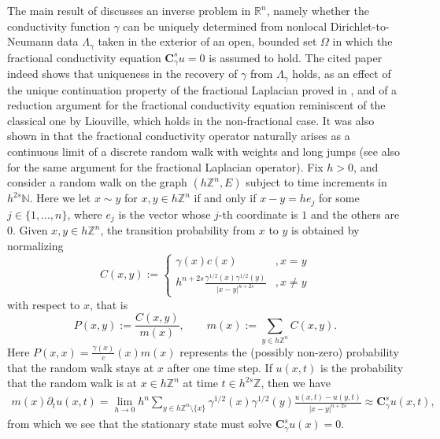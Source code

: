 \documentclass[a4paper,11pt,oneside]{amsart}
\newcommand{\Z}{{\mathbb Z}}
\newcommand{\N}{{\mathbb N}}
\begin{document}
The main result of \cite{C20} discusses an inverse problem in $\mathbb R^n$, namely whether the conductivity function $\gamma$ can be uniquely determined from nonlocal Dirichlet-to-Neumann data $\Lambda_\gamma$ taken in the exterior of an open, bounded set $\Omega$ in which the fractional conductivity equation $\mathbf C^s_\gamma u=0$ is assumed to hold. The cited paper indeed shows that uniqueness in the recovery of $\gamma$ from $\Lambda_\gamma$ holds, as an effect of the unique continuation property of the fractional Laplacian proved in \cite{GSU20}, and of a reduction argument for the fractional conductivity equation reminiscent of the classical one by Liouville, which holds in the non-fractional case. It was also shown in \cite[Section 5]{C20} that the fractional conductivity operator naturally arises as a continuous limit of a discrete random walk with weights and long jumps (see also \cite{Val09} for the same argument for the fractional Laplacian operator). Fix $h>0$, and consider a random walk on the graph $(h\Z^n,E)$ subject to time increments in $h^{2s}\N$. Here we let $x\sim y$ for $x,y\in h\Z^n$ if and only if $x-y=he_j$ for some $j\in\{1,...,n\}$, where $e_j$ is the vector whose $j$-th coordinate is $1$ and the others are $0$. Given $x,y\in h\Z^n$, the transition probability from $x$ to $y$ is obtained by normalizing
$$C(x,y):=\begin{cases}
    \gamma(x)c(x)  &, x=y \\
    h^{n+2s}\frac{\gamma^{1/2}(x)\gamma^{1/2}(y)}{|x-y|^{n+2s}}  &, x\neq y
\end{cases}$$
with respect to $x$, that is
$$ P(x,y):= \frac{C(x,y)}{m(x)}, \qquad m(x):= \sum_{y\in h\Z^n}C(x,y). $$
Here $P(x,x)=\frac{\gamma(x)}c(x){m(x)}$ represents the (possibly non-zero) probability that the random walk stays at $x$ after one time step. If $u(x,t)$ is the probability that the random walk is at $x\in h\Z^n$ at time $t\in h^{2s}\Z$, then we have
\begin{align*}
    m(x)\partial_tu(x,t)=\lim_{h\rightarrow 0}h^{n}\sum_{y\in h\Z^n\setminus\{x\}}\gamma^{1/2}(x)\gamma^{1/2}(y)\frac{u(x,t)- u(y,t)}{|x-y|^{n+2s}}\approx \mathbf C^s_\gamma u(x,t),
\end{align*}
from which we see that the stationary state must solve $\mathbf C^s_\gamma u(x)=0$.\\
\end{document}
